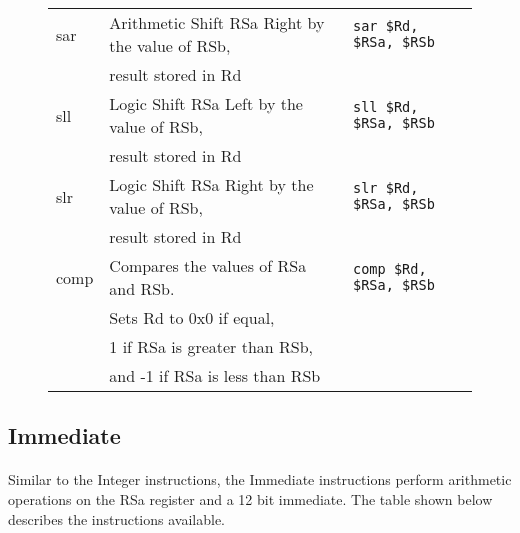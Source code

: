 \documentclass[letterpaper, 11pt]{article}
\begin{document}
\begin{figure}[!h]
\begin{center}
\begin{tabular}{|l|l|l|}
			sar					& Arithmetic Shift RSa Right by the value of RSb,						& \texttt{sar \$Rd, \$RSa, \$RSb}	\\ 	
			\hfill				& result stored in Rd													& \hfill 							\\ \hline
			sll					& Logic Shift RSa Left by the value of RSb,								& \texttt{sll \$Rd, \$RSa, \$RSb}	\\ 
			\hfill				& result stored in Rd													& \hfill 							\\ \hline	
			slr					& Logic Shift RSa Right by the value of RSb, 							& \texttt{slr \$Rd, \$RSa, \$RSb}	\\ 	
			\hfill				& result stored in Rd													& \hfill 							\\ \hline
			comp				& Compares the values of RSa and RSb. 									& \texttt{comp \$Rd, \$RSa, \$RSb}	\\
			\hfill				& Sets Rd to 0x0 if equal,												& \hfill							\\
			\hfill				& 1 if RSa is greater than RSb, 										&	\hfill							\\ 
			\hfill				& and -1 if RSa is less than RSb										& \hfill							\\ \hline
		\end{tabular} 
	\end{center}
	
\end{figure} 


\clearpage
\subsection{Immediate}
\paragraph{} Similar to the Integer instructions, the Immediate instructions perform arithmetic operations on the RSa register and a 12 bit immediate.
The table shown below describes the instructions available.
\end{document}
